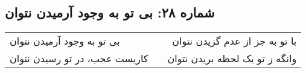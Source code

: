 \begin{center}
\section*{شماره ۲۸: بی تو به وجود آرمیدن نتوان}
\label{sec:028}
\begin{longtable}{l p{0.5cm} r}
بی تو به وجود آرمیدن نتوان
&&
با تو به جز از عدم گزیدن نتوان
\\
کاریست عجب، در تو رسیدن نتوان
&&
وانگه ز تو یک لحظه بریدن نتوان
\\
\end{longtable}
\end{center}
